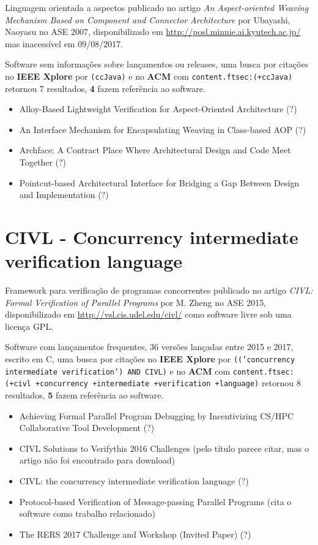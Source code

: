 Linguagem orientada a aspectos
publicado no artigo {\it An Aspect-oriented Weaving Mechanism Based on Component and Connector Architecture}
por Ubayashi, Naoyasu
no ASE 2007,
disponibilizado em \url{http://posl.minnie.ai.kyutech.ac.jp/}
mas inacessível em 09/08/2017.

Software sem informações sobre lançamentos ou releases,
uma busca por citações no {\bf IEEE Xplore} por
\texttt{(ccJava)}
e no {\bf ACM} com
\texttt{content.ftsec:(+ccJava)}
retornou
7 resultados,
{\bf 4} fazem referência ao software.

\begin{itemize}
\item Alloy-Based Lightweight Verification for Aspect-Oriented Architecture (?)
\item An Interface Mechanism for Encapsulating Weaving in Class-based AOP (?)
\item Archface: A Contract Place Where Architectural Design and Code Meet Together (?)
\item Pointcut-based Architectural Interface for Bridging a Gap Between Design and Implementation (?)
\end{itemize}

\section{CIVL - Concurrency intermediate verification language}

Framework para verificação de programas concorrentes
publicado no artigo {\it CIVL: Formal Verification of Parallel Programs}
por M. Zheng
no ASE 2015,
disponibilizado em \url{http://vsl.cis.udel.edu/civl/}
como software livre
sob uma licença GPL.

Software com lançamentos frequentes,
36 versões lançadas
entre 2015 e 2017,
escrito em C,
uma busca por citações no {\bf IEEE Xplore} por
\texttt{(('concurrency intermediate verification') AND CIVL)}
e no {\bf ACM} com
\texttt{content.ftsec:(+civl +concurrency +intermediate +verification +language)}
retornou
8 resultados,
{\bf 5} fazem referência ao software.

\begin{itemize}
\item Achieving Formal Parallel Program Debugging by Incentivizing CS/HPC Collaborative Tool Development (?)
\item CIVL Solutions to Verifythis 2016 Challenges (pelo título parece citar, mas o artigo não foi encontrado para download)
\item CIVL: the concurrency intermediate verification language (?)
\item Protocol-based Verification of Message-passing Parallel Programs (cita o software como trabalho relacionado)
\item The RERS 2017 Challenge and Workshop (Invited Paper) (?)
\end{itemize}

